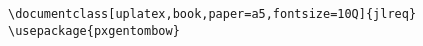\documentclass[uplatex,book,paper=a5,fontsize=10Q]{jlreq}
\begin{document}
\begin{verbatim}
\documentclass[uplatex,book,paper=a5,fontsize=10Q]{jlreq}
\usepackage{pxgentombow}
\end{verbatim}
\end{document}
